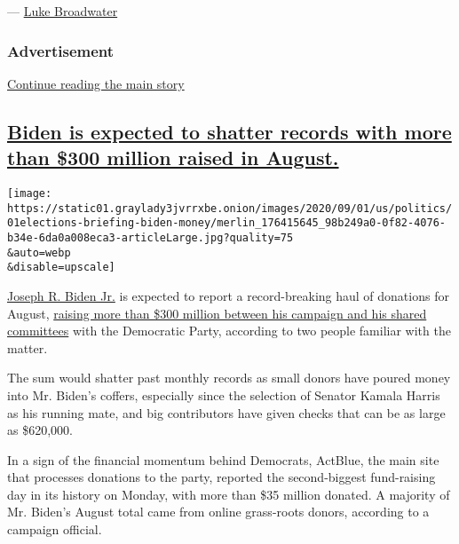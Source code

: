 --- \href{https://www.nytimes3xbfgragh.onion/by/luke-broadwater}{Luke
Broadwater}

\hypertarget{advertisement-2}{%
\subsubsection{Advertisement}\label{advertisement-2}}

\protect\hyperlink{after-dfp-ad-mid3}{Continue reading the main story}

\hypertarget{biden-is-expected-to-shatter-records-with-more-than-300-million-raised-in-august}{%
\subsection{\texorpdfstring{\protect\hyperlink{biden-is-expected-to-shatter-records-with-more-than-300-million-raised-in-august}{Biden
is expected to shatter records with more than \$300 million raised in
August.}}{Biden is expected to shatter records with more than \$300 million raised in August.}}\label{biden-is-expected-to-shatter-records-with-more-than-300-million-raised-in-august}}

\texttt{[image: https://static01.graylady3jvrrxbe.onion/images/2020/09/01/us/politics/01elections-briefing-biden-money/merlin\_176415645\_98b249a0-0f82-4076-b34e-6da0a008eca3-articleLarge.jpg?quality=75\\\&auto=webp\\\&disable=upscale]}

\href{https://www.nytimes3xbfgragh.onion/interactive/2020/us/elections/joe-biden.html}{Joseph
R. Biden Jr.} is expected to report a record-breaking haul of donations
for August,
\href{https://www.nytimes3xbfgragh.onion/2020/09/01/us/politics/biden-trump-fundraising-election.html}{raising
more than \$300 million between his campaign and his shared committees}
with the Democratic Party, according to two people familiar with the
matter.

The sum would shatter past monthly records as small donors have poured
money into Mr. Biden's coffers, especially since the selection of
Senator Kamala Harris as his running mate, and big contributors have
given checks that can be as large as \$620,000.

In a sign of the financial momentum behind Democrats, ActBlue, the main
site that processes donations to the party, reported the second-biggest
fund-raising day in its history on Monday, with more than \$35 million
donated. A majority of Mr. Biden's August total came from online
grass-roots donors, according to a campaign official.

